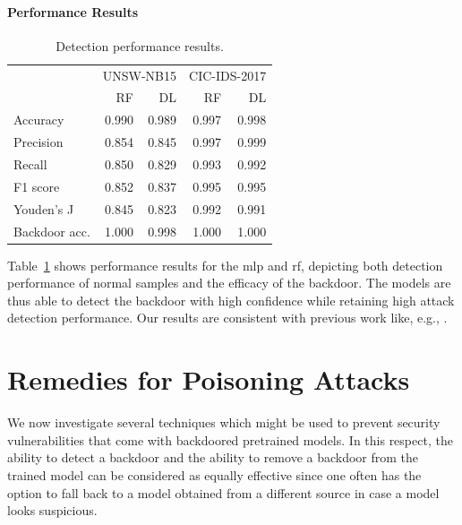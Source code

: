 \documentclass[9pt,sigconf,letterpaper,dvipsnames\ifx\removeHeaders\tempYes ,nonacm\fi]{acmart}
\newcommand{\unsw}{UNSW-NB15}
\newcommand{\cic}{CIC-IDS-2017}
\begin{document}
\paragraph{Performance Results}
\begin{table}[t]
\caption{Detection performance results.} \label{tab:performance_results}
\begin{tabular}{l r r r r} \toprule
& \multicolumn{2}{r}{\unsw{}} & \multicolumn{2}{r}{\cic{}} \\
& RF & DL & RF & DL \\ \midrule
Accuracy	& 0.990 & 0.989 & 0.997 & 0.998\\
Precision	& 0.854 & 0.845 & 0.997 & 0.999\\
Recall	& 0.850 & 0.829 & 0.993 & 0.992\\
F1 score	& 0.852 & 0.837 & 0.995 & 0.995\\
Youden's J	& 0.845 & 0.823 & 0.992 & 0.991\\
Backdoor acc.	& 1.000 & 0.998 & 1.000 & 1.000\\
\bottomrule
\end{tabular}
\end{table}
Table~\ref{tab:performance_results} shows performance results for
the \gls{mlp} and \gls{rf}, depicting both detection performance of normal samples
and the efficacy of the backdoor. The models are thus able to detect the backdoor with high confidence while retaining high attack detection performance.
Our results are consistent with previous work like, e.g., \cite{meghdouri_analysis_2018}.

\section{Remedies for Poisoning Attacks}
We now investigate several techniques which might be used to prevent security vulnerabilities that
come with backdoored pretrained  models. In this respect, the ability to detect a backdoor and the ability to remove a backdoor from the trained model can be considered as equally effective since one often has the option to fall back to a model obtained from a different source in case a model looks suspicious.
\end{document}
